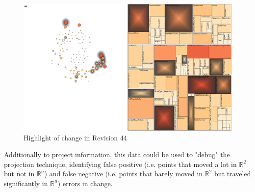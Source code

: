 \begin{figure}[H]
	\centering
	\includegraphics[width=1.0\textwidth]{figures/high_rev_44.png}
	\caption{Highlight of change in Revision 44}
	\label{fig:high_rev_44}
\end{figure}

Additionally to project information, this data could be used to "debug" the projection technique, identifying false positive (i.e. points that moved a lot in $\mathbb{R}^{2}$ but not in $\mathbb{R}^{n}$) and false negative (i.e. points that barely moved in $\mathbb{R}^{2}$ but traveled significantly in $\mathbb{R}^{n}$) errors in change.
